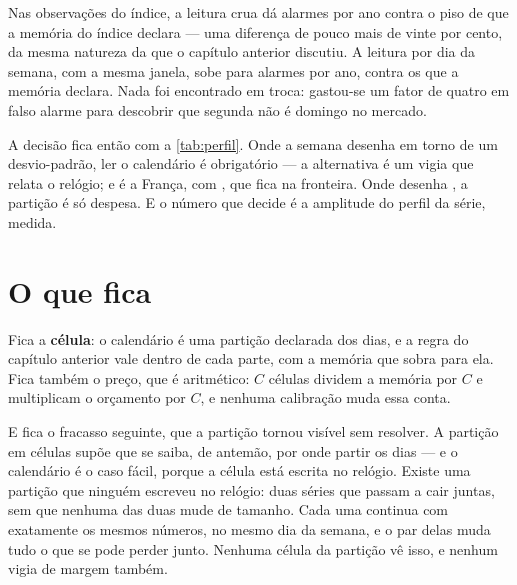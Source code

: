 Nas \numSerieDias{} observações do índice, a leitura crua dá \numCalendarioIndiceCruAlarmesAno{}
alarmes por ano contra o piso de \numCalendarioIndiceCruPisoAno{} que a memória do índice
declara --- uma diferença de pouco mais de vinte por cento, da mesma natureza da que o capítulo
anterior discutiu. A leitura por dia da semana,
com a mesma janela, sobe para \numCalendarioIndiceSemanaAlarmesAno{} alarmes por ano, contra os
\numCalendarioIndiceSemanaPisoAno{} que a memória declara. Nada foi
encontrado em troca: gastou-se um fator de quatro em falso alarme para descobrir que segunda
não é domingo no mercado.

A decisão fica então com a \cref{tab:perfil}. Onde a semana desenha em torno de um desvio-padrão,
ler o calendário é obrigatório --- a alternativa é um vigia que relata o relógio; e é a França, com
\numCalendarioAmplitudeFr, que fica na fronteira. Onde desenha \numCalendarioAmplitudeIndice, a partição
é só despesa. E o número que decide é a amplitude do perfil da série, medida.

\section{O que fica}

Fica a \textbf{célula}: o calendário é uma partição declarada dos dias, e a regra do capítulo
anterior vale dentro de cada parte, com a memória que sobra para ela. Fica também o preço, que é aritmético: $C$ células dividem a memória por $C$ e multiplicam o orçamento por $C$, e nenhuma calibração muda essa conta.

E fica o fracasso seguinte, que a partição tornou visível sem resolver. A partição em
células supõe que se saiba, de antemão, por onde partir os dias --- e o calendário é o caso
fácil, porque a célula está escrita no relógio. Existe uma partição que ninguém escreveu no relógio: duas séries que passam a cair juntas, sem que nenhuma das duas mude de
tamanho. Cada uma continua com exatamente os mesmos números, no mesmo dia da semana, e o
par delas muda tudo o que se pode perder junto. Nenhuma célula da partição vê isso, e
nenhum vigia de margem também.
